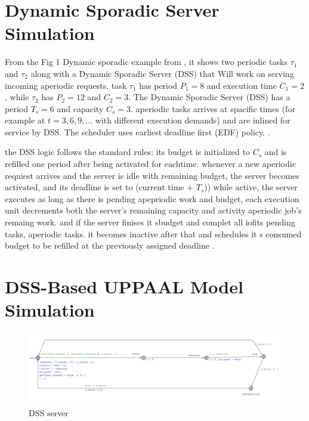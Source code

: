 \documentclass[conference]{IEEEtran}
\begin{document}
\section{Dynamic Sporadic Server Simulation}


From the Fig 1 Dynamic sporadic example from \cite{buttazzo2011hard}, it shows two periodic tasks $\tau_1$ and $\tau_2$ along with a Dynamic Sporadic Server (DSS) that Will work on serving incoming aperiodic requests. task $\tau_1$ has period $P_1=8$ and execution time $C_1=2$, while $\tau_2$ has $P_2=12$ and $C_2=3$. The Dynamic Sporadic Server (DSS) has a period $T_s=6$ and capacity $C_s=3$. aperiodic tasks arrives at spacific times (for example at $t=3,6,9,\dots$ with different execution demands) and are inlined for service by DSS. The scheduler uses earliest deadline first (EDF) policy. \cite{buttazzo2011hard}.

the DSS logic follows the standard rules: its budget is initialized to  $C_s$ and is refilled one period after being activated for eachtime\cite{buttazzo2011hard}. whenever a new aperiodic requiest arrives and the server is idle with remaining budget, the server becomes activated, and its deadline is set to (current time + $T_s$)\cite{buttazzo2011hard}) while active, the server executes as long as there is pending apepriodic work and budget, each execution unit decrements both the server's remaining capacity and activity aperiodic job's remaing work. and if the server finises it sbudget and complet all iofits pending tasks, aperiodic tasks. it becomes inactive after that and schedules it s consumed budget to be refilled at the previously assigned deadline \cite{buttazzo2011hard}.

\section{DSS-Based UPPAAL Model Simulation}


\begin{figure}
    \centering
    \includegraphics[width=1\linewidth]{DSS Server.png}
    \caption{DSS server}
    \end{figure}
\end{document}
